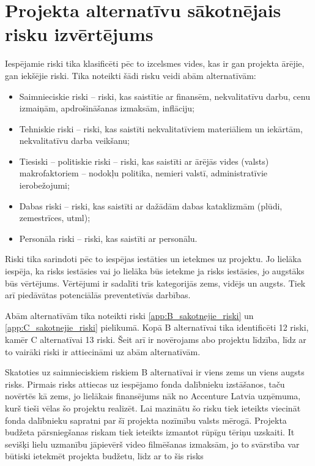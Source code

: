 \section{Projekta alternatīvu sākotnējais risku izvērtējums}
Iespējamie riski tika klasificēti pēc to izcelsmes vides, kas ir gan projekta ārējie, gan
iekšējie riski. Tika noteikti šādi risku veidi abām alternatīvām:
\begin{itemize}
    \item Saimnieciskie riski – riski, kas saistītie ar finansēm, nekvalitatīvu darbu,
cenu izmaiņām, apdrošināšanas izmaksām, inflāciju;
    \item Tehniskie riski – riski, kas saistīti nekvalitatīviem materiāliem un iekārtām, nekvalitatīvu
darba veikšanu;
    \item Tiesiski – politiskie riski – riski, kas saistīti ar ārējās vides (valsts) makrofaktoriem –
nodokļu politika, nemieri valstī, administratīvie ierobežojumi;
    \item Dabas riski – riski, kas saistīti ar dažādām dabas kataklizmām (plūdi, zemestrīces, utml);
    \item Personāla riski – riski, kas saistīti ar personālu.
\end{itemize}
Riski tika sarindoti pēc to iespējas iestāties un ietekmes uz projektu. Jo lielāka iespēja,
ka risks iestāsies vai jo lielāka būs ietekme ja risks iestāsies, jo augstāks būs vērtējums.
Vērtējumi ir sadalīti trīs kategorijās zems, vidējs un augsts. Tiek arī piedāvātas potenciālās
preventetīvās darbības.
\par
Abām alternatīvām tika noteikti riski \ref{app:B_sakotnejie_riski} un \ref{app:C_sakotnejie_riski} pielikumā.
Kopā B alternatīvai tika identificēti 12 riski, kamēr C alternatīvai 13 riski. Šeit arī ir novērojams 
abo projektu līdzība, līdz ar to vairāki riski ir attiecināmi uz abām alternatīvām.
\par 
Skatoties uz saimnieciskiem riskiem B alternatīvai ir viens zems un viens augsts risks. Pirmais risks attiecas
uz iespējamo fonda dalībnieku izstāšanos, taču novērtēs kā zems, jo lielākais finansējums nāk no
Accenture Latvia uzņēmuma, kurš tieši vēlas šo projektu realizēt. Lai mazinātu šo risku tiek ieteikts
viecināt fonda dalībnieku sapratni par šī projekta nozīmību valsts mērogā. Projekta budžeta pārsniegšanas
riskam tiek ieteikts izmantot rūpīgu tēriņu uzskaiti. It sevišķi lielu uzmanību jāpievērš video
filmēšanas izmaksām, jo to svārstība var būtiski ietekmēt projekta budžetu, līdz ar to šis risks
